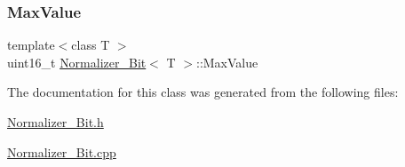 \subsubsection{\texorpdfstring{Max\+Value}{MaxValue}}
{\footnotesize\ttfamily template$<$class T $>$ \\
uint16\+\_\+t \hyperlink{classNormalizer__16Bit}{Normalizer\+\_\+Bit}$<$ T $>$\+::Max\+Value}



The documentation for this class was generated from the following files\+:\begin{DoxyCompactItemize}
\item 
\hyperlink{Normalizer__16Bit_8h}{Normalizer\+\_\+Bit.\+h}\item 
\hyperlink{Normalizer__16Bit_8cpp}{Normalizer\+\_\+Bit.\+cpp}\end{DoxyCompactItemize}
